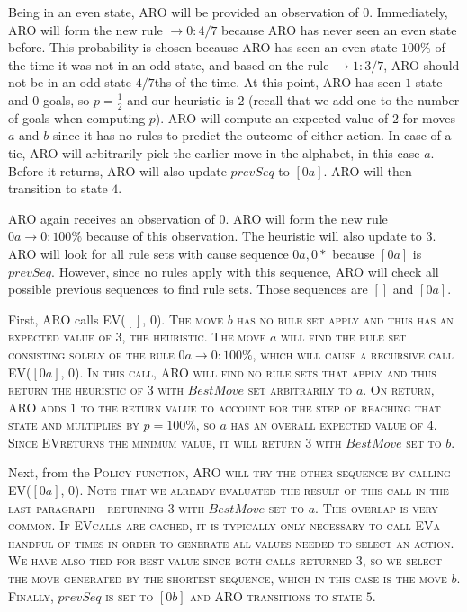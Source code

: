 \documentclass[letterpaper]{article} %
\begin{document}
Being in an even state, ARO will be provided an observation of $0$. Immediately, ARO will form the new rule $\rightarrow 0: 4/7$ because ARO has never seen an even state before. This probability is chosen because ARO has seen an even state $100\%$ of the time it was not in an odd state, and based on the rule $\rightarrow 1: 3/7$, ARO should not be in an odd state $4/7$ths of the time. At this point, ARO has seen $1$ state and $0$ goals, so $p = \frac{1}{2}$ and our heuristic is $2$ (recall that we add one to the number of goals when computing $p$). ARO will compute an expected value of $2$ for moves $a$ and $b$ since it has no rules to predict the outcome of either action. In case of a tie, ARO will arbitrarily pick the earlier move in the alphabet, in this case $a$. Before it returns, ARO will also update $prevSeq$ to $[0a]$. ARO will then transition to state $4$. 

ARO again receives an observation of $0$. ARO will form the new rule $0a \rightarrow 0: 100\%$ because of this observation. The heuristic will also update to $3$. ARO will look for all rule sets with cause sequence $0a,0*$ because $[0a]$ is $prevSeq$. However, since no rules apply with this sequence, ARO will check all possible previous sequences to find rule sets. Those sequences are $[]$ and $[0a]$. 

First, ARO calls \scshape EV($[]$, $0$)\normalfont. The move $b$ has no rule set apply and thus has an expected value of $3$, the heuristic. The move $a$ will find the rule set consisting solely of the rule $0a \rightarrow 0: 100\%$, which will cause a recursive call \scshape EV($[0a]$, $0$)\normalfont. In this call, ARO will find no rule sets that apply and thus return the heuristic of $3$ with $BestMove$ set arbitrarily to $a$. On return, ARO adds $1$ to the return value to account for the step of reaching that state and multiplies by $p = 100\%$, so $a$ has an overall expected value of $4$. Since \scshape EV\normalfont returns the minimum value, it will return $3$ with $BestMove$ set to $b$. 

Next, from the \scshape Policy \normalfont function, ARO will try the other sequence by calling \scshape EV($[0a]$, $0$)\normalfont. Note that we already evaluated the result of this call in the last paragraph - returning $3$ with $BestMove$ set to $a$. This overlap is very common. If \scshape EV\normalfont calls are cached, it is typically only necessary to call \scshape EV\normalfont a handful of times in order to generate all values needed to select an action. We have also tied for best value since both calls returned $3$, so we select the move generated by the shortest sequence, which in this case is the move $b$. Finally, $prevSeq$ is set to $[0b]$ and ARO transitions to state $5$.
\end{document}
